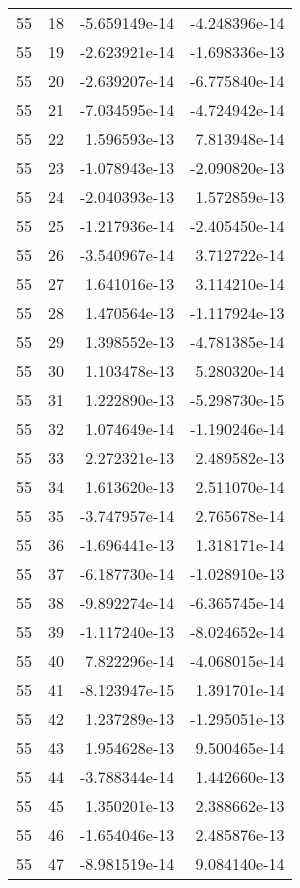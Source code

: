 \begin{tabular}{rrrr}
  55 &   18 & -5.659149e-14 & -4.248396e-14 \\
  55 &   19 & -2.623921e-14 & -1.698336e-13 \\
  55 &   20 & -2.639207e-14 & -6.775840e-14 \\
  55 &   21 & -7.034595e-14 & -4.724942e-14 \\
  55 &   22 &  1.596593e-13 &  7.813948e-14 \\
  55 &   23 & -1.078943e-13 & -2.090820e-13 \\
  55 &   24 & -2.040393e-13 &  1.572859e-13 \\
  55 &   25 & -1.217936e-14 & -2.405450e-14 \\
  55 &   26 & -3.540967e-14 &  3.712722e-14 \\
  55 &   27 &  1.641016e-13 &  3.114210e-14 \\
  55 &   28 &  1.470564e-13 & -1.117924e-13 \\
  55 &   29 &  1.398552e-13 & -4.781385e-14 \\
  55 &   30 &  1.103478e-13 &  5.280320e-14 \\
  55 &   31 &  1.222890e-13 & -5.298730e-15 \\
  55 &   32 &  1.074649e-14 & -1.190246e-14 \\
  55 &   33 &  2.272321e-13 &  2.489582e-13 \\
  55 &   34 &  1.613620e-13 &  2.511070e-14 \\
  55 &   35 & -3.747957e-14 &  2.765678e-14 \\
  55 &   36 & -1.696441e-13 &  1.318171e-14 \\
  55 &   37 & -6.187730e-14 & -1.028910e-13 \\
  55 &   38 & -9.892274e-14 & -6.365745e-14 \\
  55 &   39 & -1.117240e-13 & -8.024652e-14 \\
  55 &   40 &  7.822296e-14 & -4.068015e-14 \\
  55 &   41 & -8.123947e-15 &  1.391701e-14 \\
  55 &   42 &  1.237289e-13 & -1.295051e-13 \\
  55 &   43 &  1.954628e-13 &  9.500465e-14 \\
  55 &   44 & -3.788344e-14 &  1.442660e-13 \\
  55 &   45 &  1.350201e-13 &  2.388662e-13 \\
  55 &   46 & -1.654046e-13 &  2.485876e-13 \\
  55 &   47 & -8.981519e-14 &  9.084140e-14 \\

\end{tabular}
